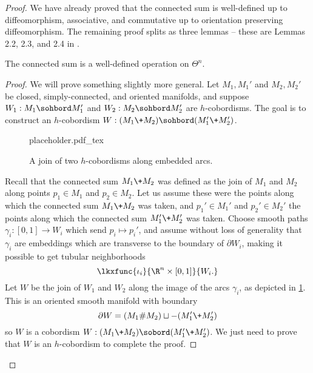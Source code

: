 \begin{proof}
	We have already proved that the connected sum is well-defined up to diffeomorphism, associative, and commutative up to orientation preserving diffeomorphism.  
	The remaining proof splits as three lemmas -- these are Lemmas 2.2, 2.3, and 2.4 in \cite{milnorkervaire1963groups}.

	\begin{lemma}
		The connected sum is a well-defined operation on $\Theta^n$.
	\end{lemma}
	\begin{proof}
		We will prove something slightly more general. Let $M_1, M_1'$ and $M_2, M_2'$ be closed, simply-connected, and oriented manifolds, and suppose $W_1 : M_1\sohbord M_1'$ and $W_2 : M_2\sohbord M_2'$ are $h$-cobordisms. The goal is to construct an $h$-cobordism $W : (M_1\+M_2)\sohbord (M_1'\+M_2')$.

		\begin{figure}[ht]
			\centering
			{placeholder.pdf_tex}
			\caption{A join of two $h$-cobordisms along embedded arcs.}\label{fig:connected-sum-of-h-cobordisms}
		\end{figure}

		Recall that the connected sum $M_1\+M_2$ was defined as the join of $M_1$ and $M_2$ along points $p_1\in M_1$ and $p_2\in M_2$. Let us assume these were the points along which the connected sum $M_1\+M_2$ was taken, and $p_1'\in M_1'$ and $p_2'\in M_2'$ the points along which the connected sum $M_1'\+M_2'$ was taken. Choose smooth paths $\gamma_i : [0,1] \to W_i$ which send $p_i\mapsto p_i'$, and assume without loss of generality that $\gamma_i$ are embeddings which are transverse to the boundary of $\partial W_i$, making it possible to get tubular neighborhoods
		\[
			\lkxfunc{\iota_i}{\R^n\times [0,1]}{W_i.}
		\]
		Let $W$ be the join of $W_1$ and $W_2$ along the image of the arcs $\gamma_i$, as depicted in \cref{fig:connected-sum-of-h-cobordisms}. This is an oriented smooth manifold with boundary
		\[
			\partial W = (M_1\#M_2)\sqcup -(M_1'\+M_2')
		\]
		so $W$ is a cobordism $W : (M_1\+M_2)\sobord (M_1'\+M_2')$. We just need to prove that $W$ is an $h$-cobordism to complete the proof.


\end{proof}
\end{proof}
